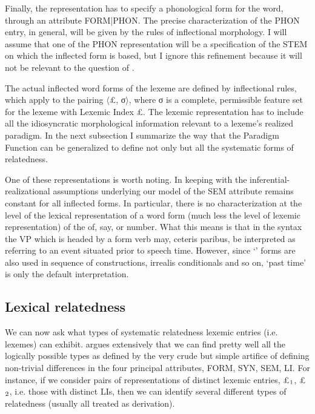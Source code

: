 \documentclass[output=paper,
modfonts
]{LSP/langsci}
\begin{document}
Finally, the representation has to specify a phonological form for the word, through an  attribute FORM|PHON. The precise characterization of the PHON entry, in general, will be given by the rules of inflectional morphology. I will assume that one  of the PHON representation will be a specification of the STEM on which the inflected form is based, but I ignore this refinement because it will not be relevant to the question of .

The actual inflected word forms of the lexeme are defined by inflectional rules, which apply to the pairing $\langle$\pounds, σ$\rangle$, where σ is a complete, permissible feature set for the lexeme with Lexemic Index \pounds. The lexemic representation has to include all the idiosyncratic morphological information relevant to a lexeme’s realized paradigm. In the next subsection I summarize the way that the Paradigm Function  can be generalized to define  not only  but all the systematic forms of relatedness. 

One  of these representations is worth noting. In keeping with the inferential-realizational assumptions underlying our model of  the SEM attribute remains constant for all inflected forms. In particular, there is no characterization at the level of the lexical representation of a word form (much less the level of lexemic representation) of the  of, say,  or number. What this means is that in the syntax the  VP  which is headed by a  form verb  may, ceteris paribus, be  interpreted as referring to an event situated prior to speech time. However, since ‘’ forms are also used in sequence of  constructions, irrealis conditionals and so on, ‘past time’ is only the default interpretation. 

\subsection{Lexical relatedness}	\label{sec:lexrel}

We can now ask what types of systematic relatedness lexemic entries (i.e. lexemes) can exhibit. \citet{Spencer13:book} argues extensively that we can find pretty well all the logically possible types as defined by the very crude but simple artifice of defining non-trivial differences in the four principal attributes, FORM, SYN, SEM, LI. For instance, if we consider  pairs of representations of distinct lexemic entries, \pounds$\sb{1}$, \pounds$\sb{2}$, i.e. those with distinct LIs, then we can identify several different types of relatedness (usually all treated as derivation). 
\end{document}
